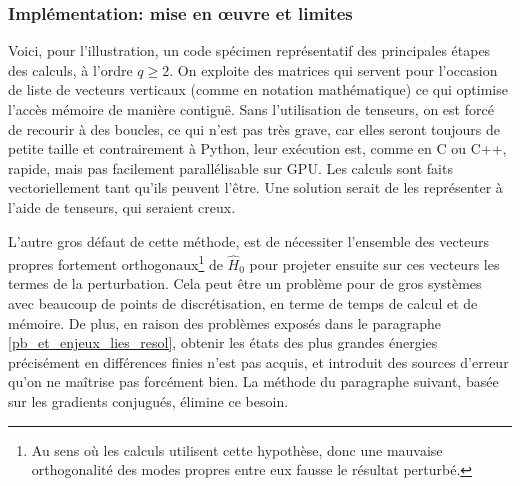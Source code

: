 \documentclass[svgnames,dvipsnames,a4paper,10pt,french]{report}
\begin{document}
\subsubsection{Implémentation: mise en \oe{}uvre et limites}
Voici, pour l'illustration, un code spécimen représentatif des principales étapes des calculs, à l'ordre $q\ge 2$. On exploite des matrices qui servent pour l'occasion de liste de vecteurs verticaux (comme en notation mathématique) ce qui optimise l'accès mémoire de manière contiguë. Sans l'utilisation de tenseurs, on est forcé de recourir à des boucles, ce qui n'est pas très grave, car elles seront toujours de petite taille et contrairement à Python, leur exécution est, comme en C ou C++, rapide, mais pas facilement parallélisable sur GPU. Les calculs sont faits vectoriellement tant qu'ils peuvent l'être. Une solution serait de les représenter à l'aide de tenseurs, qui seraient creux.

L'autre gros défaut de cette méthode, est de nécessiter l'ensemble des vecteurs propres fortement orthogonaux\footnote{Au sens où les calculs utilisent cette hypothèse, donc une mauvaise orthogonalité des modes propres entre eux fausse le résultat perturbé.} de $\hat{H}_0$ pour projeter ensuite sur ces vecteurs les termes de la perturbation. Cela peut être un problème pour de gros systèmes avec beaucoup de points de discrétisation, en terme de temps de calcul et de mémoire. De plus, en raison des problèmes exposés dans le paragraphe \ref{pb_et_enjeux_lies_resol}, obtenir les états des plus grandes énergies précisément en différences finies n'est pas acquis, et introduit des sources d'erreur qu'on ne maîtrise pas forcément bien. La méthode du paragraphe suivant, basée sur les gradients conjugués, élimine ce besoin.
\end{document}
